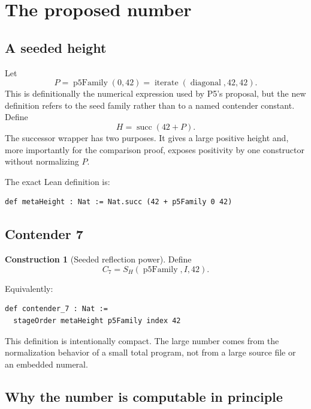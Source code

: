 \documentclass[11pt]{article}
\theoremstyle{definition}
\newtheorem{construction}[theorem]{Construction}
\theoremstyle{remark}
\newcommand{\Idx}{I}
\newcommand{\Pfive}{P}
\newcommand{\Height}{H}
\begin{document}
\section{The proposed number}

\subsection{A seeded height}

Let
\[
 \Pfive=\operatorname{p5Family}(0,42)
 =\operatorname{iterate}(\operatorname{diagonal},42,42).
\]
This is definitionally the numerical expression used by P5's proposal, but the
new definition refers to the seed family rather than to a named contender
constant.  Define
\begin{equation}\label{eq:height}
 \Height=\operatorname{succ}(42+\Pfive).
\end{equation}
The successor wrapper has two purposes.  It gives a large positive height and,
more importantly for the comparison proof, exposes positivity by one
constructor without normalizing \(\Pfive\).

The exact Lean definition is:
\begin{lstlisting}
def metaHeight : Nat := Nat.succ (42 + p5Family 0 42)
\end{lstlisting}

\subsection{Contender 7}

\begin{construction}[Seeded reflection power]\label{con:c7}
Define
\[
 C_7=S_{\Height}(\operatorname{p5Family},\Idx,42).
\]
\end{construction}
Equivalently:
\begin{lstlisting}
def contender_7 : Nat :=
  stageOrder metaHeight p5Family index 42
\end{lstlisting}

This definition is intentionally compact.  The large number comes from the
normalization behavior of a small total program, not from a large source file or
an embedded numeral.

\subsection{Why the number is computable in principle}
\end{document}
